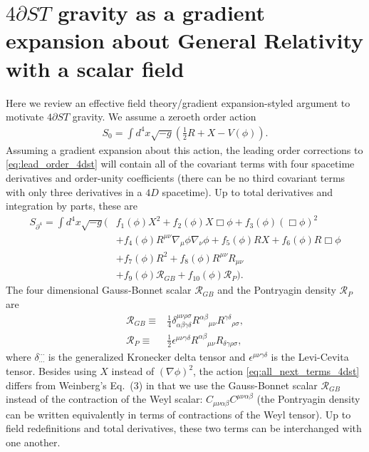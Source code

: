 \documentclass{ws-ijmpd}
\begin{document}
\section{$4\partial ST$ gravity as a gradient expansion about 
   General Relativity with a scalar field
   \label{sec:4dst_gradient_expansion}
}
   Here we review an effective field theory/gradient expansion-styled 
argument to motivate $4\partial ST$ 
gravity\cite{Weinberg:2008hq,Kovacs:2020pns,Kovacs:2020ywu}.
We assume a zeroeth order action
\begin{align}
\label{eq:lead_order_4dst}
   S_0
   =
   \int d^4x\sqrt{-g}\left(
      \frac{1}{2}R
      +
      X
      -
      V\left(\phi\right)
   \right)
   .
\end{align}
Assuming a gradient expansion about this action,
the leading order corrections to \eqref{eq:lead_order_4dst}
will contain all of the covariant terms with four spacetime derivatives
and order-unity coefficients (there can be no third covariant terms
with only three derivatives in a $4D$ spacetime).
Up to total derivatives and integration by parts, these are
\begin{align}
\label{eq:all_next_terms_4dst}
   S_{\partial^4}
   =
   \int d^4x\sqrt{-g}\Big(
      &
      f_1\left(\phi\right)X^2
      +
      f_2\left(\phi\right)X\Box\phi
      +
      f_3\left(\phi\right)\left(\Box\phi\right)^2
      \nonumber\\
      &+
      f_4\left(\phi\right)R^{\mu\nu}\nabla_{\mu}\phi\nabla_{\nu}\phi
      +
      f_5\left(\phi\right)RX
      +
      f_6\left(\phi\right)R\Box\phi
      \nonumber\\
      &+
      f_7\left(\phi\right)R^2
      +
      f_8\left(\phi\right)R^{\mu\nu}R_{\mu\nu}
      \nonumber\\
      &+
      f_9\left(\phi\right)\mathcal{R}_{GB}
      +
      f_{10}\left(\phi\right)\mathcal{R}_{P}
   \Big)
   .
\end{align}
The four dimensional Gauss-Bonnet scalar $\mathcal{R}_{GB}$ and the
Pontryagin density $\mathcal{R}_{P}$ are
\begin{align}
   \mathcal{R}_{GB}
   \equiv&
   \frac{1}{4}\delta^{\mu\nu\rho\sigma}_{\alpha\beta\gamma\delta}
   R^{\alpha\beta}{}_{\mu\nu}
   R^{\gamma\delta}{}_{\rho\sigma}
   ,\\ 
   \mathcal{R}_{P}
   \equiv&
   \frac{1}{2}
   \epsilon^{\mu\nu\gamma\delta}
   R^{\alpha\beta}{}_{\mu\nu}
   R_{\delta\gamma\rho\sigma}
   ,
\end{align}
where $\delta^{\cdots}_{\cdots}$ is the generalized Kronecker delta
tensor and $\epsilon^{\mu\nu\gamma\delta}$ is the Levi-Cevita tensor.
Besides using $X$ instead of $\left(\nabla\phi\right)^2$, the action
\eqref{eq:all_next_terms_4dst} differs from Weinberg's\cite{Weinberg:2008hq}
Eq.~(3) in that we use the Gauss-Bonnet scalar $\mathcal{R}_{GB}$ instead
of the contraction of the Weyl scalar:
$C_{\mu\nu\alpha\beta}C^{\mu\nu\alpha\beta}$
(the Pontryagin density can be written equivalently in terms
of contractions of the Weyl tensor\cite{Grumiller:2007rv}).
Up to field redefinitions and total derivatives, 
these two terms can be interchanged with one 
another\cite{Kovacs:2020pns,Kovacs:2020ywu}.
\end{document}
